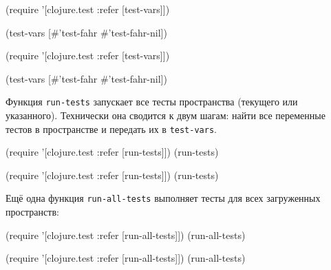 \ifnarrow

\begin{english}
  \begin{clojure}
(require
  '[clojure.test :refer [test-vars]])

(test-vars
  [#'test-fahr #'test-fahr-nil])
  \end{clojure}
\end{english}

\else

\begin{english}
  \begin{clojure}
(require '[clojure.test :refer [test-vars]])

(test-vars [#'test-fahr #'test-fahr-nil])
  \end{clojure}
\end{english}

\fi


Функция \verb|run-tests| запускает все тесты пространства (текущего или
указанного). Технически она сводится к двум шагам: найти все переменные тестов в
пространстве и передать их в \verb|test-vars|.

\ifnarrow

\begin{english}
  \begin{clojure}
(require
  '[clojure.test :refer [run-tests]])
(run-tests)
  \end{clojure}
\end{english}

\else

\begin{english}
  \begin{clojure}
(require '[clojure.test :refer [run-tests]])
(run-tests)
  \end{clojure}
\end{english}

\fi

Ещё одна функция \verb|run-all-tests| выполняет тесты для всех загруженных
пространств:

\ifnarrow

\begin{english}
  \begin{clojure}
(require
  '[clojure.test :refer [run-all-tests]])
(run-all-tests)
  \end{clojure}
\end{english}

\else

\begin{english}
  \begin{clojure}
(require '[clojure.test :refer [run-all-tests]])
(run-all-tests)
  \end{clojure}
\end{english}

